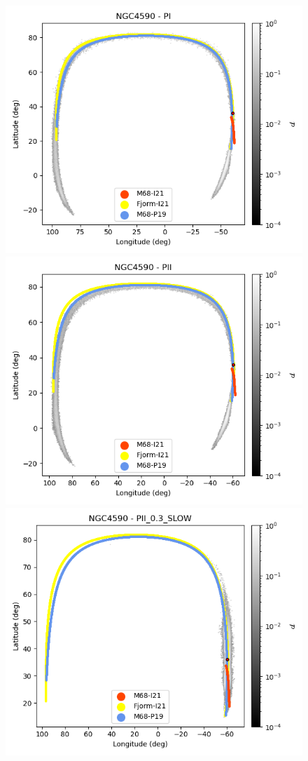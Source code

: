             \twocolumn
            \begin{figure}
                \begin{center}
                    \includegraphics[clip=true, trim = 0mm 0mm 0mm 0mm, width=0.65\columnwidth]{images/PI_individual_NGC4590_galstream-NGC4590-l-b.png}
                    \includegraphics[clip=true, trim = 0mm 0mm 0mm 0mm, width=0.65\columnwidth]{images/PII_individual_NGC4590_galstream-NGC4590-l-b.png}
                    \includegraphics[clip=true, trim = 0mm 0mm 0mm 0mm, width=0.65\columnwidth]{images/PII_0.3_SLOW_individual_NGC4590_galstream-NGC4590-l-b.png}


\end{center}
\end{figure}
